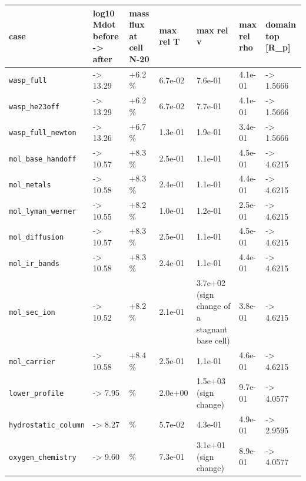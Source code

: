 \documentclass[english,a4paper]{my_memo}
\begin{document}
{\def\LTcaptype{none} %
{\small
\begin{longtable}[]{@{}>{\raggedright\arraybackslash}p{\dimexpr(\linewidth-14\tabcolsep)/7\relax}>{\raggedright\arraybackslash}p{\dimexpr(\linewidth-14\tabcolsep)/7\relax}>{\raggedright\arraybackslash}p{\dimexpr(\linewidth-14\tabcolsep)/7\relax}>{\raggedright\arraybackslash}p{\dimexpr(\linewidth-14\tabcolsep)/7\relax}>{\raggedright\arraybackslash}p{\dimexpr(\linewidth-14\tabcolsep)/7\relax}>{\raggedright\arraybackslash}p{\dimexpr(\linewidth-14\tabcolsep)/7\relax}>{\raggedright\arraybackslash}p{\dimexpr(\linewidth-14\tabcolsep)/7\relax}@{}}
\toprule\noalign{}
case & log10 Mdot before -\textgreater{} after & mass flux at cell N-20 & max rel T & max rel v & max rel rho & domain top {[}R\_p{]} \\
\midrule\noalign{}
\endhead
\bottomrule\noalign{}
\endlastfoot
\texttt{wasp\_full} & 13.24 -\textgreater{} 13.29 & +6.2 \% & 6.7e-02 & 7.6e-01 & 4.1e-01 & 1.6014 -\textgreater{} 1.5666 \\
\texttt{wasp\_he23off} & 13.24 -\textgreater{} 13.29 & +6.2 \% & 6.7e-02 & 7.7e-01 & 4.1e-01 & 1.6014 -\textgreater{} 1.5666 \\
\texttt{wasp\_full\_newton} & 13.21 -\textgreater{} 13.26 & +6.7 \% & 1.3e-01 & 1.9e-01 & 3.4e-01 & 1.6014 -\textgreater{} 1.5666 \\
\texttt{mol\_base\_handoff} & 10.52 -\textgreater{} 10.57 & +8.3 \% & 2.5e-01 & 1.1e-01 & 4.5e-01 & 4.7253 -\textgreater{} 4.6215 \\
\texttt{mol\_metals} & 10.52 -\textgreater{} 10.58 & +8.3 \% & 2.4e-01 & 1.1e-01 & 4.4e-01 & 4.7253 -\textgreater{} 4.6215 \\
\texttt{mol\_lyman\_werner} & 10.50 -\textgreater{} 10.55 & +8.2 \% & 1.0e-01 & 1.2e-01 & 2.5e-01 & 4.7253 -\textgreater{} 4.6215 \\
\texttt{mol\_diffusion} & 10.52 -\textgreater{} 10.57 & +8.3 \% & 2.5e-01 & 1.1e-01 & 4.5e-01 & 4.7253 -\textgreater{} 4.6215 \\
\texttt{mol\_ir\_bands} & 10.52 -\textgreater{} 10.58 & +8.3 \% & 2.4e-01 & 1.1e-01 & 4.4e-01 & 4.7253 -\textgreater{} 4.6215 \\
\texttt{mol\_sec\_ion} & 10.47 -\textgreater{} 10.52 & +8.2 \% & 2.1e-01 & 3.7e+02 (sign change of a stagnant base cell) & 3.8e-01 & 4.7253 -\textgreater{} 4.6215 \\
\texttt{mol\_carrier} & 10.52 -\textgreater{} 10.58 & +8.4 \% & 2.5e-01 & 1.1e-01 & 4.6e-01 & 4.7253 -\textgreater{} 4.6215 \\
\texttt{lower\_profile} & 8.44 -\textgreater{} 7.95 & -68.9 \% & 2.0e+00 & 1.5e+03 (sign change) & 9.7e-01 & 4.1487 -\textgreater{} 4.0577 \\
\texttt{hydrostatic\_column} & 8.25 -\textgreater{} 8.27 & -0.1 \% & 5.7e-02 & 4.3e-01 & 4.9e-01 & 2.9600 -\textgreater{} 2.9595 \\
\texttt{oxygen\_chemistry} & 9.61 -\textgreater{} 9.60 & -6.9 \% & 7.3e-01 & 3.1e+01 (sign change) & 8.9e-01 & 4.1487 -\textgreater{} 4.0577 \\
\end{longtable}
}
}
\end{document}
